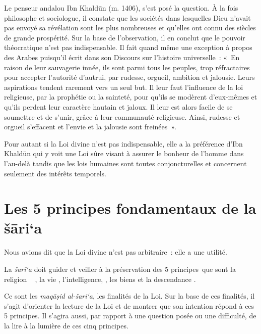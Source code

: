  

Le penseur andalou Ibn Khaldūn \label{theol:IbnKhaldun1}  (m. 1406), s'est posé la question. À la
fois philosophe et sociologue, il constate que les sociétés dans
lesquelles Dieu n'avait pas envoyé sa révélation sont les plus
nombreuses et qu'elles ont connu des siècles de grande prospérité. Sur
la base de l'observation, il en conclut que le pouvoir théocratique
n'est pas indispensable. Il fait quand même une exception à propos des
Arabes puisqu'il écrit dans son Discours sur l'histoire universelle~:
«~En raison de leur sauvagerie innée, ils sont parmi tous les peuples,
trop réfractaires pour accepter l'autorité d'autrui, par rudesse,
orgueil, ambition et jalousie. Leurs aspirations tendent rarement vers
un seul but. Il leur faut l'influence de la loi religieuse, par la
prophétie ou la sainteté, pour qu'ils se modèrent d'eux-mêmes et qu'ils
perdent leur caractère hautain et jaloux. Il leur est alors facile de se
soumettre et de s'unir, grâce à leur communauté religieuse. Ainsi,
rudesse et orgueil s'effacent et l'envie et la jalousie sont
freinées~».

Pour autant si la Loi divine n'est pas indispensable, elle a la
préférence d'Ibn Khaldūn qui y voit une Loi sûre visant à assurer le
bonheur de l'homme dans l'au-delà tandis que les lois humaines sont
toutes conjoncturelles et concernent seulement des intérêts temporels.


\section{{Les 5 principes fondamentaux de la šāri`a
}
\label{iii--les-5-principes-fondamentaux-de-la-ux161ux101ria}}

Nous avions dit que la Loi divine n'est pas arbitraire~: elle a une
utilité. 
\begin{Def}
La \emph{šarī`a} doit guider et veiller à la préservation des 5
principes~que sont la religion ~  , la vie  ,
l'intelligence,  , les biens  et la descendance
.
\end{Def}


Ce sont les \emph{maqāṣid al-šari`a}, les finalités de la Loi. Sur la
base de ces finalités, il s'agit d'orienter la lecture de la Loi et de
montrer que son intention répond à ces 5 principes. Il s'agira aussi,
par rapport à une question posée ou une difficulté, de la lire à la
lumière de ces cinq principes.

